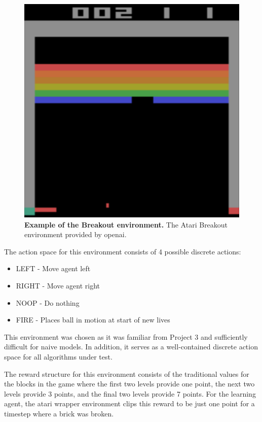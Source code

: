\documentclass[conference]{IEEEtran}
\begin{document}
\begin{figure}[htbp]
\centerline{\includegraphics[scale=0.1]{atari_breakout_sample.png}}
\caption{\textbf{Example of the Breakout environment.}  The Atari Breakout environment provided by openai.}
\label{fig:atariBreakoutEnvironment}
\end{figure}

The action space for this environment consists of 4 possible discrete actions:

\begin{itemize}
    \item LEFT - Move agent left
    \item RIGHT - Move agent right
    \item NOOP - Do nothing
    \item FIRE - Places ball in motion at start of new lives
\end{itemize}

This environment was chosen as it was familiar from Project 3 and sufficiently difficult for naive models.
In addition, it serves as a well-contained discrete action space for all algorithms under test.

The reward structure for this environment consists of the traditional values for the blocks in the game where the first two levels provide one point, the next two levels provide 3 points, and the final two levels provide 7 points.
For the learning agent, the atari wrapper environment clips this reward to be just one point for a timestep where a brick was broken.
\end{document}
